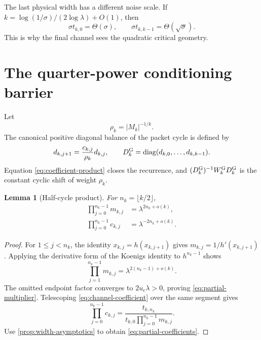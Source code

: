 \documentclass[11pt]{article}
\newtheorem{lemma}[theorem]{Lemma}
\theoremstyle{definition}
\theoremstyle{remark}
\newcommand{\uc}{u_{\mathrm c}}
\begin{document}
The last physical width has a different noise scale.  If
$k=\log(1/\sigma)/(2\log\lambda)+O(1)$, then
\begin{equation}\label{eq:physical-width-scales}
 \sigma t_{k,0}=\Theta(\sigma),
 \qquad
 \sigma t_{k,k-1}=\Theta(\sqrt\sigma).
\end{equation}
This is why the final channel sees the quadratic critical geometry.

\section{The quarter-power conditioning barrier}
\label{sec:conditioning}

Let
\begin{equation}\label{eq:packet-rho}
 \rho_k=|M_k|^{-1/k}.
\end{equation}
The canonical positive diagonal balance of the packet cycle is defined by
\begin{equation}\label{eq:packet-balance}
 d_{k,j+1}=\frac{c_{k,j}}{\rho_k}d_{k,j},
 \qquad
 D_k^{\rm G}=\operatorname{diag}(d_{k,0},\ldots,d_{k,k-1}).
\end{equation}
Equation \eqref{eq:coefficient-product} closes the recurrence, and
$(D_k^{\rm G})^{-1}W_k^{\rm G}D_k^{\rm G}$ is the constant cyclic shift of
weight $\rho_k$.

\begin{lemma}[Half-cycle product]
\label{lem:half-cycle-product}
For $n_k=\lfloor k/2\rfloor$,
\begin{align}
 \prod_{j=0}^{n_k-1}m_{k,j}
 &=\lambda^{2n_k+o(k)},
 \label{eq:partial-multiplier}\\
 \prod_{j=0}^{n_k-1}c_{k,j}
 &=\lambda^{-2n_k+o(k)}.
 \label{eq:partial-coefficients}
\end{align}
\end{lemma}

\begin{proof}
For $1\le j<n_k$, the identity $x_{k,j}=h(x_{k,j+1})$ gives
$m_{k,j}=1/h'(x_{k,j+1})$.  Applying the derivative form of the Koenigs
identity to $h^{n_k-1}$ shows
\[
 \prod_{j=1}^{n_k-1}m_{k,j}
 =\lambda^{2(n_k-1)+o(k)}.
\]
The omitted endpoint factor converges to $2\uc\lambda>0$, proving
\eqref{eq:partial-multiplier}.  Telescoping
\eqref{eq:channel-coefficient} over the same segment gives
\[
 \prod_{j=0}^{n_k-1}c_{k,j}
 =\frac{t_{k,n_k}}
 {t_{k,0}\prod_{j=0}^{n_k-1}m_{k,j}}.
\]
Use \cref{prop:width-asymptotics} to obtain
\eqref{eq:partial-coefficients}.
\end{proof}
\end{document}
